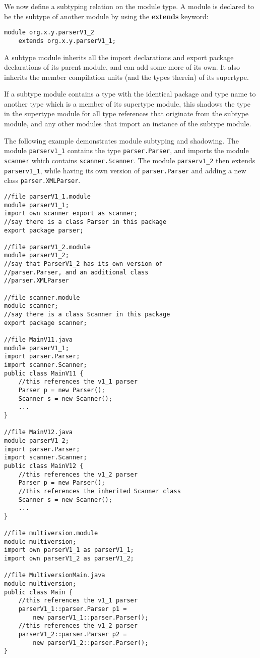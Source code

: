 
We now define a subtyping relation on the module type. A module is declared
to be the subtype of another module by using the \textbf{extends} keyword:

\begin{lstlisting}
module org.x.y.parserV1_2 
	extends org.x.y.parserV1_1;
\end{lstlisting}

A subtype module inherits all the import declarations and export package declarations 
of its parent module, and can add some more of its own. It also inherits the member 
compilation units (and the types therein) of its supertype.

If a subtype module contains a type with the identical package and type name
to another type which is a member of its supertype module, 
this shadows the type in the supertype module for all type references that
originate from the subtype module, and any other modules that import an
instance of the subtype module.

The following example demonstrates module subtyping and shadowing. The module
{\tt parserv1\_1} contains the type {\tt parser.Parser}, and imports
the module {\tt scanner} which contains {\tt scanner.Scanner}. The module
{\tt parserv1\_2} then extends {\tt parserv1\_1}, while having its
own version of {\tt parser.Parser} and adding a new class {\tt parser.XMLParser}.

\begin{lstlisting}[caption=Module Subtyping]
//file parserV1_1.module
module parserV1_1;
import own scanner export as scanner;
//say there is a class Parser in this package
export package parser;

//file parserV1_2.module
module parserV1_2;
//say that ParserV1_2 has its own version of 
//parser.Parser, and an additional class
//parser.XMLParser

//file scanner.module
module scanner;
//say there is a class Scanner in this package
export package scanner;

//file MainV11.java
module parserV1_1;
import parser.Parser;
import scanner.Scanner;
public class MainV11 {
	//this references the v1_1 parser
	Parser p = new Parser(); 
	Scanner s = new Scanner();
	...
}

//file MainV12.java
module parserV1_2;
import parser.Parser;
import scanner.Scanner;
public class MainV12 {
	//this references the v1_2 parser
	Parser p = new Parser(); 
	//this references the inherited Scanner class
	Scanner s = new Scanner();
	...
}

//file multiversion.module
module multiversion;
import own parserV1_1 as parserV1_1;
import own parserV1_2 as parserV1_2;

//file MultiversionMain.java
module multiversion;
public class Main {
	//this references the v1_1 parser
	parserV1_1::parser.Parser p1 = 
		new parserV1_1::parser.Parser();
	//this references the v1_2 parser
	parserV1_2::parser.Parser p2 =
		new parserV1_2::parser.Parser();
}
\end{lstlisting}

